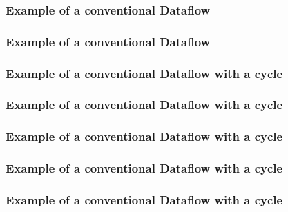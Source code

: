 \documentclass[aspectratio=169,10pt]{beamer}
\begin{document}
\begin{frame}
  \frametitle{Example of a conventional Dataflow}
  \begin{center}
    
  \end{center}
\end{frame}

\begin{frame}
  \frametitle{Example of a conventional Dataflow}
  \begin{center}
    
  \end{center}
\end{frame}

\begin{frame}[fragile]
  \frametitle{Example of a conventional Dataflow with a cycle}
  \begin{center}
    
  \end{center}
\end{frame}

\begin{frame}
  \frametitle{Example of a conventional Dataflow with a cycle}
  \begin{center}
    
  \end{center}
\end{frame}

\begin{frame}
  \frametitle{Example of a conventional Dataflow with a cycle}
  \begin{center}
    
  \end{center}
\end{frame}

\begin{frame}
  \frametitle{Example of a conventional Dataflow with a cycle}
  \begin{center}
    
  \end{center}
\end{frame}

\begin{frame}
  \frametitle{Example of a conventional Dataflow with a cycle}
  \begin{center}
    
  \end{center}
\end{frame}
\end{document}
